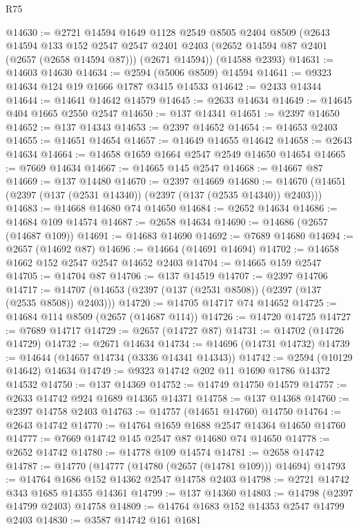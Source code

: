 \begin{lexlean}{R75}
\begin{coremodule}
@14630 := @2721
    @14594
    @1649
    @1128
    @2549
    @8505
    @2404
    @8509
    (@2643
      @14594
      @133
      @152
      @2547
      @2547
      @2401
      @2403
      (@2652 @14594 @87 @2401 (@2657 (@2658 @14594 @87)))
      (@2671 @14594))
    (@14588 @2393)
@14631 := @14603 @14630
@14634 := @2594 (@5006 @8509) @14594
@14641 := @9323 @14634 @124 @19 @1666 @1787 @3415 @14533
@14642 := @2433 @14344
@14644 := @14641 @14642 @14579
@14645 := @2633 @14634
@14649 := @14645 @404 @1665 @2550 @2547
@14650 := @137 @14341
@14651 := @2397 @14650
@14652 := @137 @14343
@14653 := @2397 @14652
@14654 := @14653 @2403
@14655 := @14651 @14654
@14657 := @14649 @14655 @14642
@14658 := @2643 @14634
@14664 := @14658 @1659 @1664 @2547 @2549 @14650 @14654
@14665 := @7669 @14634
@14667 := @14665 @145 @2547
@14668 := @14667 @87
@14669 := @137 @14480
@14670 := @2397 @14669
@14680 := @14670 (@14651 (@2397 (@137 (@2531 @14340)) (@2397 (@137 (@2535 @14340)) @2403)))
@14683 := @14668 @14680 @74 @14650
@14684 := @2652 @14634
@14686 := @14684 @109 @14574
@14687 := @2658 @14634
@14690 := @14686 (@2657 (@14687 @109))
@14691 := @14683 @14690
@14692 := @7689 @14680
@14694 := @2657 (@14692 @87)
@14696 := @14664 (@14691 @14694)
@14702 := @14658 @1662 @152 @2547 @2547 @14652 @2403
@14704 := @14665 @159 @2547
@14705 := @14704 @87
@14706 := @137 @14519
@14707 := @2397 @14706
@14717 := @14707 (@14653 (@2397 (@137 (@2531 @8508)) (@2397 (@137 (@2535 @8508)) @2403)))
@14720 := @14705 @14717 @74 @14652
@14725 := @14684 @114 @8509 (@2657 (@14687 @114))
@14726 := @14720 @14725
@14727 := @7689 @14717
@14729 := @2657 (@14727 @87)
@14731 := @14702 (@14726 @14729)
@14732 := @2671 @14634
@14734 := @14696 (@14731 @14732)
@14739 := @14644 (@14657 @14734 (@3336 @14341 @14343))
@14742 := @2594 (@10129 @14642) @14634
@14749 := @9323 @14742 @202 @11 @1690 @1786 @14372 @14532
@14750 := @137 @14369
@14752 := @14749 @14750 @14579
@14757 := @2633 @14742 @924 @1689 @14365 @14371
@14758 := @137 @14368
@14760 := @2397 @14758 @2403
@14763 := @14757 (@14651 @14760) @14750
@14764 := @2643 @14742
@14770 := @14764 @1659 @1688 @2547 @14364 @14650 @14760
@14777 := @7669 @14742 @145 @2547 @87 @14680 @74 @14650
@14778 := @2652 @14742
@14780 := @14778 @109 @14574
@14781 := @2658 @14742
@14787 := @14770 (@14777 (@14780 (@2657 (@14781 @109))) @14694)
@14793 := @14764 @1686 @152 @14362 @2547 @14758 @2403
@14798 := @2721 @14742 @343 @1685 @14355 @14361
@14799 := @137 @14360
@14803 := @14798 (@2397 @14799 @2403) @14758
@14809 := @14764 @1683 @152 @14353 @2547 @14799 @2403
@14830 := @3587
    @14742
    @161
    @1681

\end{coremodule}
\end{lexlean}
